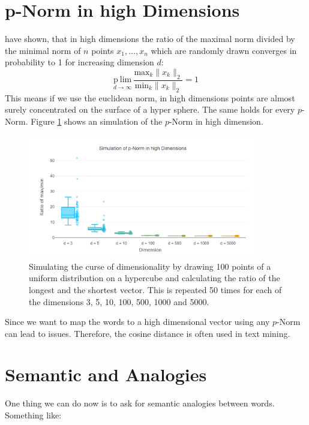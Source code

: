 \section{p-Norm in high Dimensions}

\cite{aggarwal2001surprising} have shown, that in high dimensions the ratio of the 
maximal norm divided by the minimal norm of $n$ points $x_1, \dots, x_n$
which are randomly drawn converges in probability to 1 for increasing
dimension $d$:
\[
\underset{{d\rightarrow\infty}}{\mathrm{p~lim}}\ \frac{\mathrm{max}_k \|x_k\|_2}{\mathrm{min}_k \|x_k\|_2} = 1
\]
This means if we use the euclidean norm, in high dimensions points are almost surely concentrated on the surface of a hyper sphere. The same holds for every $p$-Norm.
Figure \ref{fig:p-norm} shows an simulation of the $p$-Norm in high dimension.


\begin{figure}[!h]
\centering
\includegraphics[width=0.9\textwidth]{images/p_norm_hd.png} 
\caption[Curse of dimensionality simulation.]{Simulating the curse of dimensionality
         by drawing 100 points of a uniform distribution on a hypercube and 
         calculating the ratio of the longest and the shortest vector. This is 
         repeated 50 times for each of the dimensions 3, 5, 10, 100, 500, 
         1000 and 5000.}
\label{fig:p-norm}
\end{figure}

Since we want to map the words to a high dimensional vector using any $p$-Norm can lead
to issues. Therefore, the cosine distance is often used in text mining.

\section{Semantic and Analogies}\label{sec:sem-ana}

One thing we can do now is to ask for semantic analogies between words. 
Something like:

